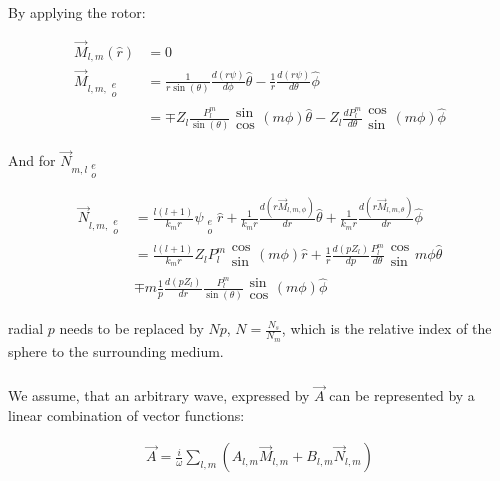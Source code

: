             By applying the rotor:

            \begin{align}
                \vec{M}_{l,m}(\hat{r}) &= 0 \\
                \vec{M}_{l,m, \substack{e \\ o}} &= \frac{1}{r\sin(\theta)}\frac{d(r\psi)}{d\phi}\hat{\theta} - \frac{1}{r}\frac{d(r\psi)}{d\theta}\hat{\phi} \\
                &= \mp Z_l\frac{P^m_l}{\sin(\theta)}\substack{\sin \\\cos}(m\phi)\hat{\theta} - Z_l\frac{dP^m_l}{d\theta}\substack{\cos \\ \sin}(m\phi)\hat{\phi}
            \end{align}

            And for $\vec{N}_{m,l\substack{e\\ o}}$

            \begin{align}
                \vec{N}_{l,m,\substack{e\\ o}} &= \frac{l(l+1)}{k_mr}\psi_{\substack{e\\ o}}\hat{r}
                    + \frac{1}{k_mr}\frac{d(r\vec{M}_{l,m,\phi})}{dr} \hat{\theta} + \frac{1}{k_m r}\frac{d(r\vec{M}_{l,m,\theta})}{dr}\hat{\phi} \\
                &= \frac{l(l+1)}{k_mr}Z_l P_l^m \substack{\cos\\\sin}(m\phi) \hat{r}
                    + \frac{1}{r}\frac{d(pZ_l)}{dp}\frac{P_l^m}{d\theta}\substack{\cos\\\sin}m\phi\hat{\theta}  \\
                &\mp m\frac{1}{p}\frac{d(pZ_l)}{dr}\frac{P_l^m}{\sin(\theta)}\substack{\sin\\\cos}(m\phi)\hat{\phi}
            \end{align}

            radial $p$ needs to be replaced by $Np$, $N = \frac{N_s}{N_m}$, which is the relative index of the sphere to the surrounding
            medium.


        \subsubsection{}
            We assume, that an arbitrary wave, expressed by $\vec{A}$ can be represented by a linear combination of vector functions:

            \begin{align}
                \vec{A} = \frac{i}{\omega}\sum_{l,m}\left(A_{l,m}\vec{M}_{l,m}+B_{l,m}\vec{N}_{l,m}\right)
            \end{align}

